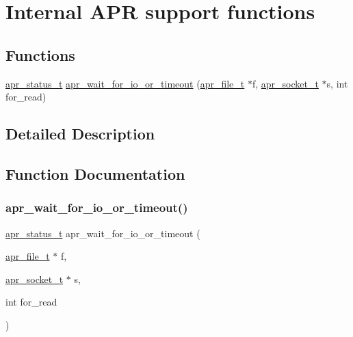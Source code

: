 \hypertarget{group__apr__support}{}\section{Internal A\+PR support functions}
\label{group__apr__support}
\subsection*{Functions}
\begin{DoxyCompactItemize}
\item 
\mbox{\hyperlink{group__apr__errno_gaf76ee4543247e9fb3f3546203e590a6c}{apr\+\_\+status\+\_\+t}} \mbox{\hyperlink{group__apr__support_ga324ffc66a6d42df2325ce999001c1c36}{apr\+\_\+wait\+\_\+for\+\_\+io\+\_\+or\+\_\+timeout}} (\mbox{\hyperlink{structapr__file__t}{apr\+\_\+file\+\_\+t}} $\ast$f, \mbox{\hyperlink{structapr__socket__t}{apr\+\_\+socket\+\_\+t}} $\ast$s, int for\+\_\+read)
\end{DoxyCompactItemize}


\subsection{Detailed Description}


\subsection{Function Documentation}
\mbox{\label{group__apr__support_ga324ffc66a6d42df2325ce999001c1c36}} 
\subsubsection{\texorpdfstring{apr\+\_\+wait\+\_\+for\+\_\+io\+\_\+or\+\_\+timeout()}{apr\_wait\_for\_io\_or\_timeout()}}
{\footnotesize\ttfamily \mbox{\hyperlink{group__apr__errno_gaf76ee4543247e9fb3f3546203e590a6c}{apr\+\_\+status\+\_\+t}} apr\+\_\+wait\+\_\+for\+\_\+io\+\_\+or\+\_\+timeout (\begin{DoxyParamCaption}\item[{\mbox{\hyperlink{structapr__file__t}{apr\+\_\+file\+\_\+t}} $\ast$}]{f,  }\item[{\mbox{\hyperlink{structapr__socket__t}{apr\+\_\+socket\+\_\+t}} $\ast$}]{s,  }\item[{int}]{for\+\_\+read }\end{DoxyParamCaption})}

